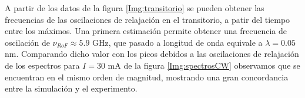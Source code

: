 		A partir de los datos de la figura \ref{Img:transitorio} se pueden obtener las frecuencias de las oscilaciones de relajación en el transitorio, a patir del tiempo entre los máximos. Una primera estimación permite obtener una frecuencia de oscilación de $\nu_{RoF} \approx 5.9$ GHz, que pasado a longitud de onda equivale a $\lambda = 0.05$ nm. Comparando dicho valor con los picos debidos a las oscilaciones de relajación de los espectros para $I = 30$ mA de la figura \ref{Img:spectrosCW} observamos que se encuentran en el mismo orden de magnitud, mostrando una gran concordancia entre la simulación y el experimento.
